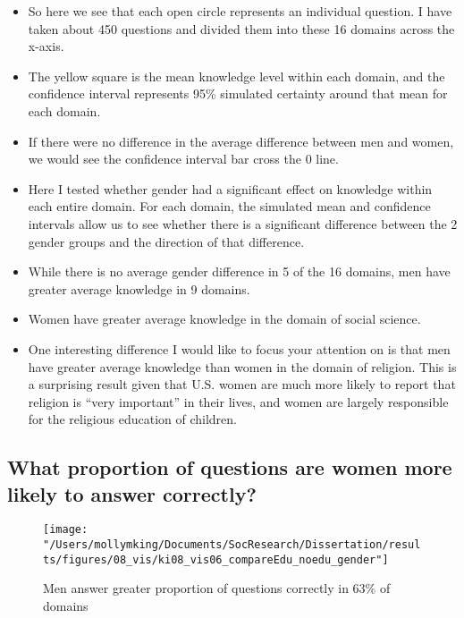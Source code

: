 \documentclass[]{article}
\begin{document}
\begin{itemize}
  \item{So here we see that each open circle represents an individual question. I have taken about 450 questions and divided them into these 16 domains across the x-axis.}
  \item{The yellow square is the mean knowledge level within each domain, and the confidence interval represents 95\% simulated certainty around that mean for each domain.}
  \item{If there were no difference in the average difference between men and women, we would see the confidence interval bar cross the 0 line.}
  \item{Here I tested whether gender had a significant effect on knowledge within each entire domain. For each domain, the simulated mean and confidence intervals allow us to see whether there is a significant difference between the 2 gender groups and the direction of that difference.}
  \item{While there is no average gender difference in 5 of the 16 domains, men have greater average knowledge in 9 domains.}
  \item{Women have greater average knowledge in the domain of social science.}
  \item{One interesting difference I would like to focus your attention on is that men have greater average knowledge than women in the domain of religion. This is a surprising result given that U.S. women are much more likely to report that religion is ``very important'' in their lives, and women are largely responsible for the religious education of children.}
\end{itemize}

\newpage
\subsection{What proportion of questions are women more likely to answer correctly?}
\begin{figure}[ht]
    \begin{center}
      \texttt{[image: "/Users/mollymking/Documents/SocResearch/Dissertation/results/figures/08\_vis/ki08\_vis06\_compareEdu\_noedu\_gender"]}
      \caption{Men answer greater proportion of questions correctly in 63\% of domains}
    \end{center}
\end{figure}
\end{document}
